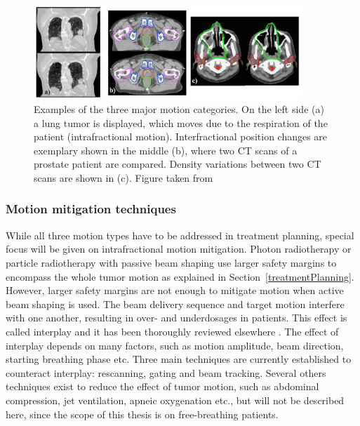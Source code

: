 \documentclass[type=dr, dr=rernat, accentcolor=tud7b,colorbacktitle, bigchapter, openright, twoside, 12pt ]{tudthesis}
\begin{document}
\begin{figure}[H]
\begin{center}
\includegraphics[width=0.9\textwidth]{./Images/motion_examples.png}
\caption{Examples of the three major motion categories. On the left side (a) a lung tumor is displayed, which moves due to the respiration 
of the patient (intrafractional motion). Interfractional position changes are exemplary shown in the middle (b), where two CT scans of a 
prostate patient are compared. Density variations between two CT scans are shown in (c). Figure taken from \cite{Engelsman2011}}
\label{motion}
\end{center}
\end{figure}

\subsubsection{Motion mitigation techniques}

While all three motion types have to be addressed in treatment planning, special focus will be given on intrafractional motion mitigation. Photon radiotherapy or particle radiotherapy with passive beam shaping 
use larger safety margins to encompass the whole tumor motion as explained in Section~\ref{treatmentPlanning}. However, larger safety margins are not enough to mitigate motion when active beam shaping is used. The beam delivery 
sequence and target motion interfere with one another, resulting in over- and underdosages in patients. This effect is called interplay and it has been thoroughly reviewed elsewhere \cite{Phillips1992,Bert2008}. The effect of interplay depends
on many factors, such as motion amplitude, beam direction, starting breathing phase etc. Three main techniques are currently established to counteract interplay: rescanning, gating and beam tracking. Several others techniques exist
to reduce the effect of tumor motion, such as abdominal compression, jet ventilation, apneic oxygenation etc., but will not be described here, since the scope of this thesis is on free-breathing patients.
\end{document}
